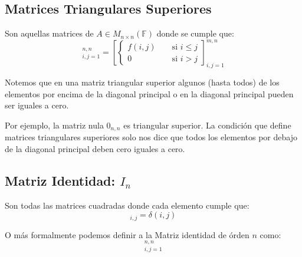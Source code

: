 \documentclass[12pt]{report}                                    %
\DeclareMathOperator \Space {\quad}                             %
\DeclareMathOperator \MiniSpace {\;}                            %
\newcommand{\Brackets}[1]{\left[ #1 \right]}                    %
\begin{document}
            \clearpage
            \subsection{Matrices Triangulares Superiores}

                Son aquellas matrices de $A \in M_{n \times n}(\mathbb{F})$ donde se cumple que: 
                \begin{equation}
                    [f(i,j)]_{i, j = 1}^{n, n} =
                    \Brackets{
                        \begin{cases}
                            f(i,j)  \MiniSpace& \text{ si } i \leq j \\
                            0       \MiniSpace& \text{ si } i > j
                        \end{cases}
                    }_{i, j = 1}^{m, n}  
                \end{equation}


                Notemos que en una matriz triangular superior algunos (hasta todos) de los elementos por encima de la diagonal
                principal o en la diagonal principal pueden ser iguales a cero.

                Por ejemplo, la matriz nula $0_{n,n}$ es triangular superior. La condición que define matrices triangulares
                superiores solo nos dice que todos los elementos por debajo de la diagonal principal deben cero iguales a cero.


            \clearpage
            \subsection{Matriz Identidad: $I_n$}

                Son todas las matrices cuadradas donde cada elemento cumple que:
                \begin{equation}
                    [I]_{i,j} = \delta(i,j)
                \end{equation}

                O más formalmente podemos definir a la Matriz identidad de órden $n$ como:
                \begin{equation}
                    [\delta(i,j)]_{i, j = 1}^{n, n}
                \end{equation}
\end{document}
